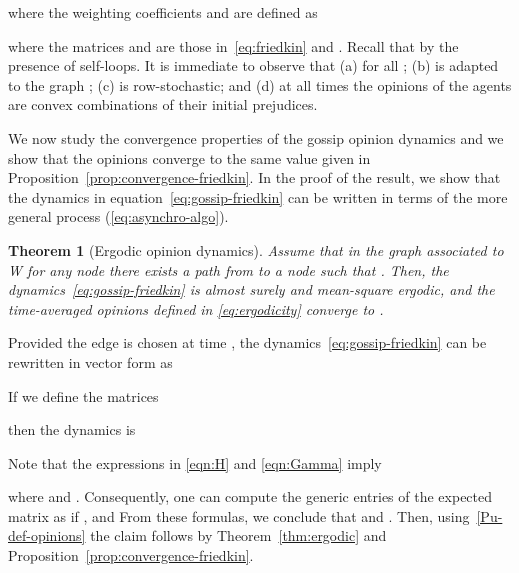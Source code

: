 \documentclass{IEEEtran}
\newtheorem{theorem}{Theorem}
\newcommand{\1}{\mathbf{1}} \newcommand{\ind}{\mathds{1}}
\begin{document}
where the weighting coefficients  and  are defined as 


where the matrices  and  are those in~\eqref{eq:friedkin} and . Recall that  by the presence of self-loops. 
It is immediate to observe that
(a)  for all ; (b)  is adapted to the graph ;
(c)  is row-stochastic; and (d) at all times the opinions of the agents are convex combinations of their initial prejudices.

We now study the convergence properties of the gossip opinion dynamics and we show that the opinions converge to the same value  given in Proposition~\ref{prop:convergence-friedkin}. 
In the proof of the result, we show that the dynamics in equation~\eqref{eq:gossip-friedkin}
can be written in terms of the more general process (\ref{eq:asynchro-algo}).

\begin{theorem}[Ergodic opinion dynamics]
\label{thm:gossip-opinions} 
Assume that in the graph
associated to W for any node  there exists a path from
 to a node  such that  .
Then, the dynamics~\eqref{eq:gossip-friedkin} is 
almost surely and mean-square ergodic, and the time-averaged opinions defined in \eqref{eq:ergodicity} converge to .
\end{theorem}
\begin{IEEEproof}
Provided the edge  is chosen at time , the dynamics~\eqref{eq:gossip-friedkin} can be rewritten in vector form as

If we define the matrices 

then the dynamics is 

Note that
the expressions in \eqref{eqn:H} and \eqref{eqn:Gamma} imply

where  and . Consequently, one can compute the generic entries of the expected matrix  as 
 if ,   and
 From these formulas, we conclude that  and .
Then, using~\eqref{Pu-def-opinions} the claim follows by Theorem~\ref{thm:ergodic} and Proposition~\ref{prop:convergence-friedkin}.
\end{IEEEproof}
\end{document}
